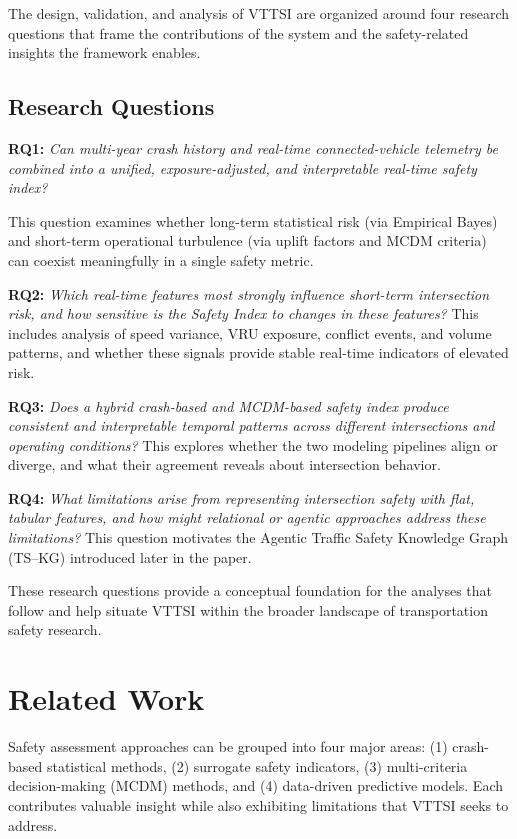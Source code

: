 \documentclass[conference]{IEEEtran}
\begin{document}
The design, validation, and analysis of VTTSI are organized around four research
questions that frame the contributions of the system and the safety-related insights
the framework enables.

\subsection*{Research Questions}

\noindent\textbf{RQ1:} \emph{Can multi-year crash history and real-time connected-vehicle telemetry be combined into a unified, exposure-adjusted, and interpretable real-time safety index?} 

This question examines whether long-term statistical risk (via Empirical Bayes) and
short-term operational turbulence (via uplift factors and MCDM criteria) can coexist
meaningfully in a single safety metric.

\noindent\textbf{RQ2:} \emph{Which real-time features most strongly influence short-term
intersection risk, and how sensitive is the Safety Index to changes in these
features?}  
This includes analysis of speed variance, VRU exposure, conflict events, and volume
patterns, and whether these signals provide stable real-time indicators of elevated
risk.

\noindent\textbf{RQ3:} \emph{Does a hybrid crash-based and MCDM-based safety index produce 
consistent and interpretable temporal patterns across different intersections and
operating conditions?}  
This explores whether the two modeling pipelines align or diverge, and what their
agreement reveals about intersection behavior.

\noindent\textbf{RQ4:} \emph{What limitations arise from representing intersection safety with 
flat, tabular features, and how might relational or agentic approaches address these
limitations?}  
This question motivates the Agentic Traffic Safety Knowledge Graph (TS--KG)
introduced later in the paper.

These research questions provide a conceptual foundation for the analyses that
follow and help situate VTTSI within the broader landscape of transportation safety
research.

\section{Related Work}
\label{sec:relatedwork}

Safety assessment approaches can be grouped into four major areas:
(1) crash-based statistical methods,
(2) surrogate safety indicators,
(3) multi-criteria decision-making (MCDM) methods, and
(4) data-driven predictive models. Each contributes valuable insight while also
exhibiting limitations that VTTSI seeks to address.
\end{document}
